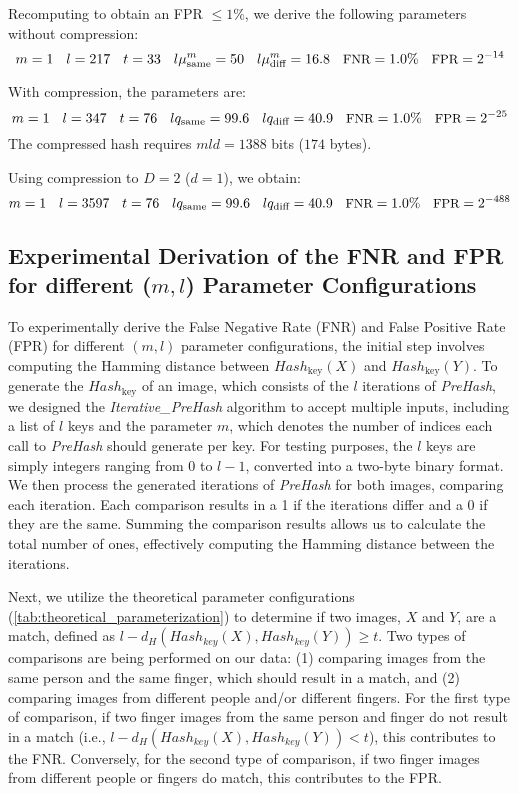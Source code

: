 Recomputing to obtain an FPR \(\leq 1\%\), we derive the following parameters without compression:
\begin{equation}
\small
m = 1 \quad l = 217 \quad t = 33 \quad l\mu_{\text{same}}^m = 50 \quad l\mu_{\text{diff}}^m = 16.8 \quad \text{FNR} = 1.0\% \quad \text{FPR} = 2^{-14}
\end{equation}

With compression, the parameters are:
\begin{equation}
\small
m = 1 \quad l = 347 \quad t = 76 \quad lq_{\text{same}} = 99.6 \quad lq_{\text{diff}} = 40.9 \quad \text{FNR} = 1.0\% \quad \text{FPR} = 2^{-25}
\end{equation}
The compressed hash requires \( mld = 1388 \) bits (\( 174 \) bytes).

Using compression to \( D = 2 \) (\( d = 1 \)), we obtain:
\begin{equation}
\small
m = 1 \quad l = 3597 \quad t = 76 \quad lq_{\text{same}} = 99.6 \quad lq_{\text{diff}} = 40.9 \quad \text{FNR} = 1.0\% \quad \text{FPR} = 2^{-488}
\end{equation}


\subsection{Experimental Derivation of the FNR and FPR for different (\(m, l\)) Parameter Configurations}
To experimentally derive the False Negative Rate (FNR) and False Positive Rate (FPR) for different \((m, l)\) parameter configurations, the initial step involves computing the Hamming distance between \( Hash_{\text{key}}(X) \) and \( Hash_{\text{key}}(Y) \). To generate the \( Hash_{\text{key}} \) of an image, which consists of the \( l \) iterations of \textit{PreHash}, we designed the \textit{Iterative\_PreHash} algorithm to accept multiple inputs, including a list of \( l \) keys and the parameter \( m \), which denotes the number of indices each call to \textit{PreHash} should generate per key. For testing purposes, the \( l \) keys are simply integers ranging from 0 to \( l-1 \), converted into a two-byte binary format. We then process the generated iterations of \textit{PreHash} for both images, comparing each iteration. Each comparison results in a 1 if the iterations differ and a 0 if they are the same. Summing the comparison results allows us to calculate the total number of ones, effectively computing the Hamming distance between the iterations.

Next, we utilize the theoretical parameter configurations (\ref{tab:theoretical_parameterization}) to determine if two images, \(X\) and \(Y\), are a match, defined as \(l - d_H(Hash_{key}(X), Hash_{key}(Y)) \geq t \). Two types of comparisons are being performed on our data: (1) comparing images from the same person and the same finger, which should result in a match, and (2) comparing images from different people and/or different fingers. For the first type of comparison, if two finger images from the same person and finger do not result in a match (i.e., \( l - d_H(Hash_{key}(X), Hash_{key}(Y)) < t \)), this contributes to the FNR. Conversely, for the second type of comparison, if two finger images from different people or fingers do match, this contributes to the FPR.

